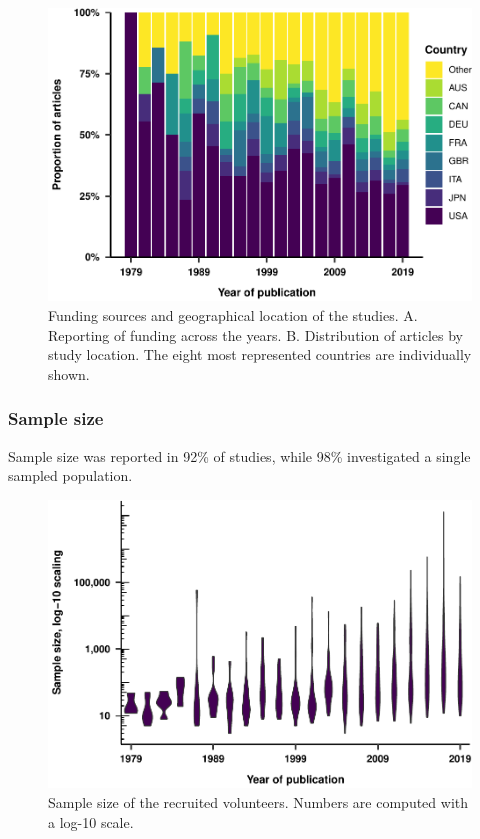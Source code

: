 \documentclass[
  english,
  jou,floatsintext]{apa6}
\begin{document}
\begin{figure}
\centering
\includegraphics{article_files/figure-latex/unnamed-chunk-4-1.pdf}
\caption{\label{fig:unnamed-chunk-4}Funding sources and geographical location of the studies. A. Reporting of funding across the years. B. Distribution of articles by study location. The eight most represented countries are individually shown.}
\end{figure}

\hypertarget{sample-size}{%
\subsubsection{Sample size}\label{sample-size}}

Sample size was reported in 92\% of studies, while 98\% investigated a single sampled population.

\begin{figure}
\centering
\includegraphics{article_files/figure-latex/unnamed-chunk-5-1.pdf}
\caption{\label{fig:unnamed-chunk-5}Sample size of the recruited volunteers. Numbers are computed with a log-10 scale.}
\end{figure}
\end{document}
